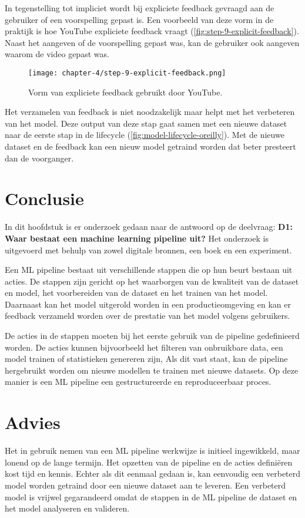 In tegenstelling tot impliciet wordt bij expliciete feedback gevraagd aan de gebruiker of een voorspelling gepast is. Een voorbeeld van deze vorm in de praktijk is hoe YouTube expliciete feedback vraagt (\autoref{fig:step-9-explicit-feedback}). Naast het aangeven of de voorspelling gepast was, kan de gebruiker ook aangeven waarom de video gepast was.

\begin{figure}[hbt!]
  \centering
  \texttt{[image: chapter-4/step-9-explicit-feedback.png]}
  \caption{Vorm van expliciete feedback gebruikt door YouTube.}
  \label{fig:step-9-explicit-feedback}
\end{figure}

Het verzamelen van feedback is niet noodzakelijk maar helpt met het verbeteren van het model. Deze output van deze stap gaat samen met een nieuwe dataset naar de eerste stap in de lifecycle (\autoref{fig:model-lifecycle-oreilly}). Met de nieuwe dataset en de feedback kan een nieuw model getraind worden dat beter presteert dan de voorganger.

\section{Conclusie}\label{sec:ch4-conclusie}
In dit hoofdstuk is er onderzoek gedaan naar de antwoord op de deelvraag: \textbf{D1: Waar bestaat een machine learning pipeline uit?} Het onderzoek is uitgevoerd met behulp van zowel digitale bronnen, een boek en een experiment.

Een ML pipeline bestaat uit verschillende stappen die op hun beurt bestaan uit acties. De stappen zijn gericht op het waarborgen van de kwaliteit van de dataset en model, het voorbereiden van de dataset en het trainen van het model. Daarnaast kan het model uitgerold worden in een productieomgeving en kan er feedback verzameld worden over de prestatie van het model volgens gebruikers.

De acties in de stappen moeten bij het eerste gebruik van de pipeline gedefinieerd worden. De acties kunnen bijvoorbeeld het filteren van onbruikbare data, een model trainen of statistieken genereren zijn, Als dit vast staat, kan de pipeline hergebruikt worden om nieuwe modellen te trainen met nieuwe datasets. Op deze manier is een ML pipeline een gestructureerde en reproduceerbaar proces.

\section{Advies}\label{sec:ch4-advies}
Het in gebruik nemen van een ML pipeline werkwijze is initieel ingewikkeld, maar lonend op de lange termijn. Het opzetten van de pipeline en de acties definiëren kost tijd en kennis. Echter als dit eenmaal gedaan is, kan eenvoudig een verbeterd model worden getraind door een nieuwe dataset aan te leveren. Een verbeterd model is vrijwel gegarandeerd omdat de stappen in de ML pipeline de dataset en het model analyseren en valideren.

